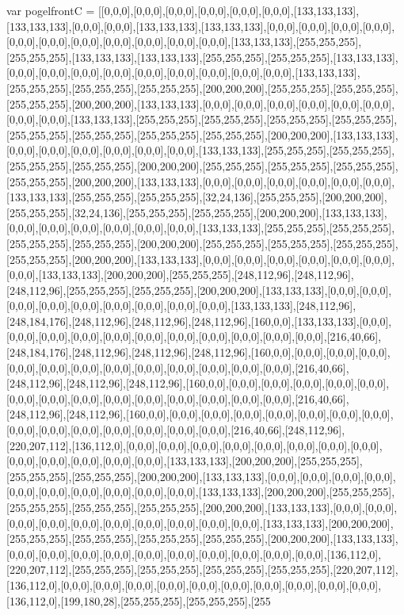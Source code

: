 var pogelfrontC = [[0,0,0],[0,0,0],[0,0,0],[0,0,0],[0,0,0],[0,0,0],[133,133,133],[133,133,133],[0,0,0],[0,0,0],[133,133,133],[133,133,133],[0,0,0],[0,0,0],[0,0,0],[0,0,0],[0,0,0],[0,0,0],[0,0,0],[0,0,0],[0,0,0],[0,0,0],[0,0,0],[133,133,133],[255,255,255],[255,255,255],[133,133,133],[133,133,133],[255,255,255],[255,255,255],[133,133,133],[0,0,0],[0,0,0],[0,0,0],[0,0,0],[0,0,0],[0,0,0],[0,0,0],[0,0,0],[0,0,0],[133,133,133],[255,255,255],[255,255,255],[255,255,255],[200,200,200],[255,255,255],[255,255,255],[255,255,255],[200,200,200],[133,133,133],[0,0,0],[0,0,0],[0,0,0],[0,0,0],[0,0,0],[0,0,0],[0,0,0],[0,0,0],[133,133,133],[255,255,255],[255,255,255],[255,255,255],[255,255,255],[255,255,255],[255,255,255],[255,255,255],[255,255,255],[200,200,200],[133,133,133],[0,0,0],[0,0,0],[0,0,0],[0,0,0],[0,0,0],[0,0,0],[133,133,133],[255,255,255],[255,255,255],[255,255,255],[255,255,255],[200,200,200],[255,255,255],[255,255,255],[255,255,255],[255,255,255],[200,200,200],[133,133,133],[0,0,0],[0,0,0],[0,0,0],[0,0,0],[0,0,0],[0,0,0],[133,133,133],[255,255,255],[255,255,255],[32,24,136],[255,255,255],[200,200,200],[255,255,255],[32,24,136],[255,255,255],[255,255,255],[200,200,200],[133,133,133],[0,0,0],[0,0,0],[0,0,0],[0,0,0],[0,0,0],[0,0,0],[133,133,133],[255,255,255],[255,255,255],[255,255,255],[255,255,255],[200,200,200],[255,255,255],[255,255,255],[255,255,255],[255,255,255],[200,200,200],[133,133,133],[0,0,0],[0,0,0],[0,0,0],[0,0,0],[0,0,0],[0,0,0],[0,0,0],[133,133,133],[200,200,200],[255,255,255],[248,112,96],[248,112,96],[248,112,96],[255,255,255],[255,255,255],[200,200,200],[133,133,133],[0,0,0],[0,0,0],[0,0,0],[0,0,0],[0,0,0],[0,0,0],[0,0,0],[0,0,0],[0,0,0],[133,133,133],[248,112,96],[248,184,176],[248,112,96],[248,112,96],[248,112,96],[160,0,0],[133,133,133],[0,0,0],[0,0,0],[0,0,0],[0,0,0],[0,0,0],[0,0,0],[0,0,0],[0,0,0],[0,0,0],[0,0,0],[0,0,0],[216,40,66],[248,184,176],[248,112,96],[248,112,96],[248,112,96],[160,0,0],[0,0,0],[0,0,0],[0,0,0],[0,0,0],[0,0,0],[0,0,0],[0,0,0],[0,0,0],[0,0,0],[0,0,0],[0,0,0],[0,0,0],[216,40,66],[248,112,96],[248,112,96],[248,112,96],[160,0,0],[0,0,0],[0,0,0],[0,0,0],[0,0,0],[0,0,0],[0,0,0],[0,0,0],[0,0,0],[0,0,0],[0,0,0],[0,0,0],[0,0,0],[0,0,0],[0,0,0],[216,40,66],[248,112,96],[248,112,96],[160,0,0],[0,0,0],[0,0,0],[0,0,0],[0,0,0],[0,0,0],[0,0,0],[0,0,0],[0,0,0],[0,0,0],[0,0,0],[0,0,0],[0,0,0],[0,0,0],[0,0,0],[216,40,66],[248,112,96],[220,207,112],[136,112,0],[0,0,0],[0,0,0],[0,0,0],[0,0,0],[0,0,0],[0,0,0],[0,0,0],[0,0,0],[0,0,0],[0,0,0],[0,0,0],[0,0,0],[0,0,0],[133,133,133],[200,200,200],[255,255,255],[255,255,255],[255,255,255],[200,200,200],[133,133,133],[0,0,0],[0,0,0],[0,0,0],[0,0,0],[0,0,0],[0,0,0],[0,0,0],[0,0,0],[0,0,0],[0,0,0],[133,133,133],[200,200,200],[255,255,255],[255,255,255],[255,255,255],[255,255,255],[200,200,200],[133,133,133],[0,0,0],[0,0,0],[0,0,0],[0,0,0],[0,0,0],[0,0,0],[0,0,0],[0,0,0],[0,0,0],[0,0,0],[133,133,133],[200,200,200],[255,255,255],[255,255,255],[255,255,255],[255,255,255],[200,200,200],[133,133,133],[0,0,0],[0,0,0],[0,0,0],[0,0,0],[0,0,0],[0,0,0],[0,0,0],[0,0,0],[0,0,0],[0,0,0],[136,112,0],[220,207,112],[255,255,255],[255,255,255],[255,255,255],[255,255,255],[220,207,112],[136,112,0],[0,0,0],[0,0,0],[0,0,0],[0,0,0],[0,0,0],[0,0,0],[0,0,0],[0,0,0],[0,0,0],[0,0,0],[136,112,0],[199,180,28],[255,255,255],[255,255,255],[255
